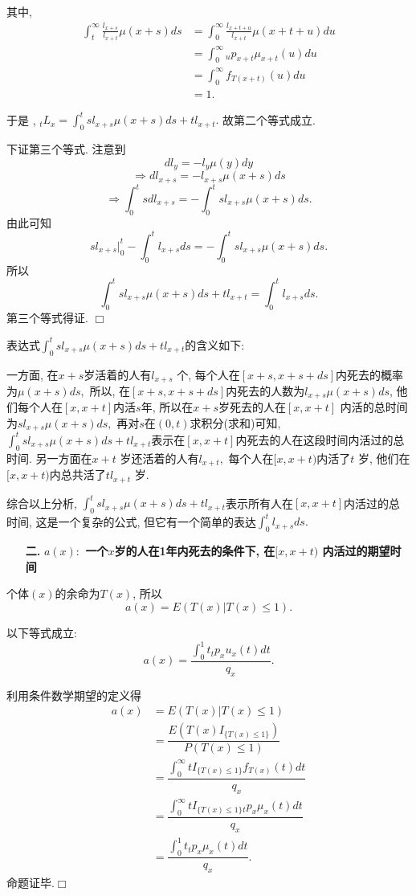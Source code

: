 \documentclass[a4paper,10pt]{ctexbook}
\newcommand{\hei}{\CJKfamily{hei}}      %
\def\qed{\hfill$\Box$\medskip}
\begin{document}
其中,\begin{align*}
    \int_t^{\infty}\frac{l_{x+s}}{l_{x+t}}\mu(x+s)ds
     & =\int_0^{\infty}\frac{l_{x+t+u}}{l_{x+t}}\mu(x+t+u)du \\
     & =\int_0^{\infty}{}_up_{x+t}\mu_{x+t}(u)du             \\
     & =\int_0^{\infty}f_{T{(x+t)}}(u)du                     \\
     & =1.
\end{align*}

于是 , ${}_tL_x=\int_0^tsl_{x+s}\mu(x+s)ds+tl_{x+t}.$ 故第二个等式成立.


下证第三个等式. 注意到
$$dl_y=-l_y\mu(y)dy$$
$$\Rightarrow dl_{x+s}=-l_{x+s}\mu(x+s)ds$$
$$\Rightarrow\int_0^tsdl_{x+s}=-\int_0^tsl_{x+s}\mu(x+s)ds.$$
由此可知$$sl_{x+s}\vert^{t}_{0}-\int_0^tl_{x+s}ds=-\int_0^tsl_{x+s}\mu(x+s)ds.$$
所以
$$\int_0^tsl_{x+s}\mu(x+s)ds+tl_{x+t}=\int_0^tl_{x+s}ds.$$
第三个等式得证.
\qed

表达式$\int_0^tsl_{x+s}\mu(x+s)ds+tl_{x+t}$的含义如下:

\noindent 一方面, 在$x+s$岁活着的人有$l_{x+s}$ 个, 每个人在$[x+s,x+s+ds]$内死去的概率为$\mu(x+s)ds,$ 所以, 在$[x+s,x+s+ds]$内死去的人数为$l_{x+s}\mu(x+s)ds$, 他们每个人在$[x,x+t]$内活$s$年, 所以在$x+s$岁死去的人在$[x,x+t]$ 内活的总时间为$sl_{x+s}\mu(x+s)ds,$ 再对$s$在$(0,t)$求积分(求和)可知, $\int_0^tsl_{x+s}\mu(x+s)ds+tl_{x+t}$表示在$[x,x+t]$内死去的人在这段时间内活过的总时间. 另一方面在$x+t$ 岁还活着的人有$l_{x+t},$ 每个人在$[x,x+t)$内活了$t$ 岁, 他们在$[x,x+t)$内总共活了$tl_{x+t}$ 岁.

综合以上分析, $\int_0^tsl_{x+s}\mu(x+s)ds+tl_{x+t}$表示所有人在$[x,x+t]$内活过的总时间, 这是一个复杂的公式, 但它有一个简单的表达$\int_0^tl_{x+s}ds.$

\begin{itemize}
    \item[{\bf\hei 二.}]{\bf\hei $a(x):$ 一个$x$岁的人在1年内死去的条件下, 在$[x,x+t)$ 内活过的期望时间}
\end{itemize}

个体$(x)$的余命为$T(x)$, 所以$$a(x)=E(T(x)|T(x)\le1).$$
\begin{proposition}以下等式成立:
    $$a(x)=\dfrac {\int_0^1t{}_tp_xu_x(t)dt}{q_x}.$$
\end{proposition}
\proof 利用条件数学期望的定义得
\begin{align*}
    a(x) & =E(T(x)|T(x)\le1)                                                \\
         & =\dfrac {E(T(x)I_{\{T(x)\le1\}})}{P(T(x)\le1)}                   \\
         & =\dfrac {\int_0^{\infty}tI_{\{T(x)\le1\}}f_{T(x)}(t)dt}{q_x}     \\
         & =\dfrac {\int_0^{\infty}tI_{\{T(x)\le1\}}{}_tp_x\mu_x(t)dt}{q_x} \\
         & =\dfrac {\int_0^1t{}_tp_x\mu_x(t)dt}{q_x}.
\end{align*}
命题证毕.\qed
\end{document}
